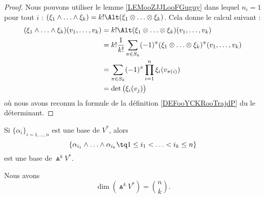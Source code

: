 \begin{proof}
	Nous pouvons utiliser le lemme \ref{LEMooZJJLooFGuguy} dans lequel \( n_i=1\) pour tout \( i\) : \( (\xi_1\wedge\ldots\wedge \xi_k)=k!\Alt(\xi_1\otimes\ldots\otimes \xi_k)\). Cela donne le calcul suivant :
	\begin{subequations}
		\begin{align}
			(\xi_1\wedge\ldots\wedge \xi_k)(v_1,\ldots,v_k) & =k!\Alt(\xi_1\otimes\ldots\otimes\xi_k)(v_1,\ldots,v_k)                                            \\
			                                                & =k!\frac{1}{ k!}\sum_{\pi\in S_k}(-1)^{\pi}(\xi_1\otimes\ldots\otimes \xi_k)^{\pi}(v_1,\ldots,v_k) \\
			                                                & =\sum_{\pi\in S_k}(-1)^{\pi}\prod_{i=1}^n\xi_i(v_{\pi(i)})                                         \\
			                                                & =\det\big( \xi_i(v_j) \big)
		\end{align}
	\end{subequations}
	où nous avons reconnu la formule de la définition \ref{DEFooYCKRooTrajdP} du le déterminant.
\end{proof}

\begin{proposition}
	Si \( \{ \alpha_i \}_{i=1,\ldots,n}\) est une base de \( V^*\), alors
	\begin{equation}
		\{ \alpha_{i_1}\wedge\ldots\wedge \alpha_{i_k}\tq 1\leq i_1< \ldots <i_k\leq n \}
	\end{equation}
	est une base de \( \Wedge^kV^*\).

	Nous avons
	\begin{equation}
		\dim(\Wedge^kV^*)=\binom{n}{k}.
	\end{equation}
\end{proposition}

